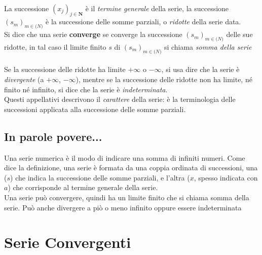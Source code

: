 \documentclass[12pt, a4paper, openany]{book}
\begin{document}
\paragraph*{}La successione $(x_j)_{j\in \mathbf{N}}$ è il \emph{termine generale} della serie, la successione $(s_m)_{m\in \mathbf(N)}$ è la successione delle somme parziali, o \emph{ridotte} della serie data.\\
Si dice che una serie \textbf{converge} se converge la successione $(s_m)_{m\in \mathbf(N)}$ delle sue ridotte, in tal caso il limite finito $s$ di $(s_m)_{m\in \mathbf(N)}$ si chiama \emph{somma della serie}
\paragraph*{}Se la successione delle ridotte ha limite $+ \infty$ o $- \infty$, si usa dire che la serie è \emph{divergente} (a $+ \infty$, $- \infty$), mentre se la successione delle ridotte non ha limite, né finito né infinito, si dice che la serie è \emph{indeterminata}.
\\Questi appellativi descrivono il \emph{carattere} della serie: è  la terminologia delle successioni applicata alla successione delle somme parziali. 

\subsection*{In parole povere...}
Una serie numerica è il modo di indicare una somma di infiniti numeri.
Come dice la definizione, una serie è formata da una coppia ordinata di successioni, una ($s$) che indica la successione delle somme parziali, e l'altra ($x$, spesso indicata con $a$) che corrisponde al termine generale della serie.
\\Una serie può convergere, quindi ha un limite finito che si chiama somma della serie. Può anche divergere a piò o meno infinito oppure essere indeterminata


\section{Serie Convergenti}
\end{document}
